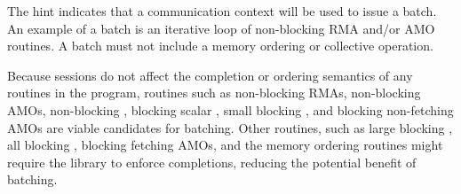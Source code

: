 \begin{apidefinition}
{    The  hint indicates that a communication context
    will be used to issue a batch.  An example of a
    batch is an iterative loop of non-blocking RMA and/or AMO routines. A batch
    must not include a memory ordering or collective operation.

    Because sessions do not affect the completion or ordering semantics of any
    \openshmem routines in the program, routines such as non-blocking RMAs,
    non-blocking AMOs, non-blocking , blocking scalar
    , small blocking , and blocking non-fetching AMOs are
    viable candidates for batching.  Other routines, such as large blocking
    , all blocking , blocking fetching AMOs, and the memory
    ordering routines might require the library to enforce completions,
    reducing the potential benefit of batching.
    } \hline

 \hline

\sessiontableend


\end{apidefinition}
